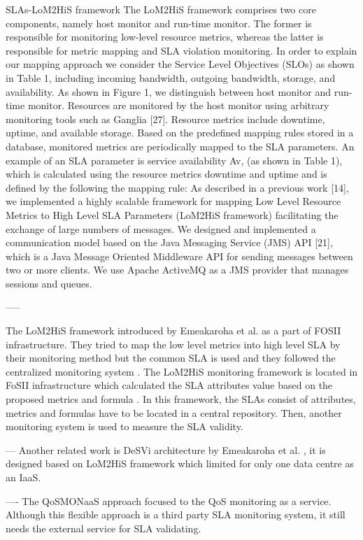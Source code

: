 SLAs-LoM2HiS framework
The LoM2HiS framework comprises two core components, namely host monitor and run-time monitor. The former is responsible for monitoring low-level resource metrics, whereas the latter is responsible for metric mapping and SLA
violation monitoring. In order to explain our mapping approach we consider
the Service Level Objectives (SLOs) as shown in Table 1, including incoming
bandwidth, outgoing bandwidth, storage, and availability.
As shown in Figure 1, we distinguish between host monitor and run-time
monitor. Resources are monitored by the host monitor using arbitrary monitoring tools such as Ganglia [27]. Resource metrics include downtime, uptime, and
available storage. Based on the predefined mapping rules stored in a database,
monitored metrics are periodically mapped to the SLA parameters. An example
of an SLA parameter is service availability Av, (as shown in Table 1), which is
calculated using the resource metrics downtime and uptime and is defined by
the following the mapping rule: As described in a previous work [14], we implemented a highly scalable framework for mapping Low Level Resource Metrics to High Level SLA Parameters
(LoM2HiS framework) facilitating the exchange of large numbers of messages.
We designed and implemented a communication model based on the Java Messaging Service (JMS) API [21], which is a Java Message Oriented Middleware
API for sending messages between two or more clients. We use Apache ActiveMQ
as a JMS provider that manages sessions and queues.


-----


The LoM2HiS framework introduced by Emeakaroha et al. \cite{ [emeakaroha2010low] } as a part of FOSII \cite{fosii} infrastructure. They tried to map the low level metrics into high level SLA by their monitoring method but the common SLA is used and they followed the centralized monitoring system \cite{articleEmeakaroha2013}. The LoM2HiS monitoring framework is located in FoSII infrastructure which calculated the SLA attributes value based on the proposed metrics and formula \cite{articleEmeakaroha2013}. In this framework, the SLAs consist of attributes, metrics and formulas have to be located in a central repository.  Then, another monitoring system is used to measure the SLA validity. 

---
Another related work is DeSVi architecture by Emeakaroha et al. \cite{EMEAKAROHA20121017}, it is designed based on LoM2HiS \cite{5547150} framework which limited for only one data centre as an IaaS. 

----
The QoSMONaaS approach \cite{articleQoSMONaas} focused to the QoS monitoring as a service. Although this flexible approach is a third party SLA monitoring system, it still needs the external service for SLA validating.



